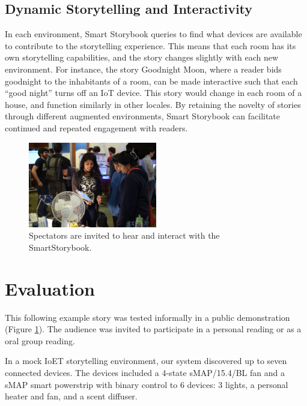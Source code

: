 \documentclass{sigchi}
\newcommand\name{SmartStorybook}
\begin{document}
\subsection{Dynamic Storytelling and Interactivity}
In each environment, Smart Storybook queries to find what devices are available to contribute to the storytelling experience. This means that each room has its own storytelling capabilities, and the story changes slightly with each new environment. For instance, the story Goodnight Moon, where a reader bids goodnight to the inhabitants of a room, can be made interactive such that each ``good night'' turns off an IoT device. This story would change in each room of a house, and function similarly in other locales. By retaining the novelty of stories through different augmented environments, Smart Storybook can facilitate continued and repeated engagement with readers. 



\begin{figure}[t!]
    \centering
    \includegraphics[keepaspectratio, width=0.5\textwidth]{figures/demo.jpg} 
    \caption{Spectators are invited to hear and interact with the \name.}
    \vspace{-10pt}
    \label{fig:demo} 
  \end{figure}
\section{Evaluation}
This following example story was tested informally in a public demonstration (Figure \ref{fig:demo}). The audience was invited to participate in a personal reading or as a oral group reading.

In a mock IoET storytelling environment, our system discovered up to seven connected devices. The devices included a 4-state sMAP/15.4/BL fan and a sMAP smart powerstrip with binary control to 6 devices: 3 lights, a personal heater and fan, and a scent diffuser.  
\end{document}
